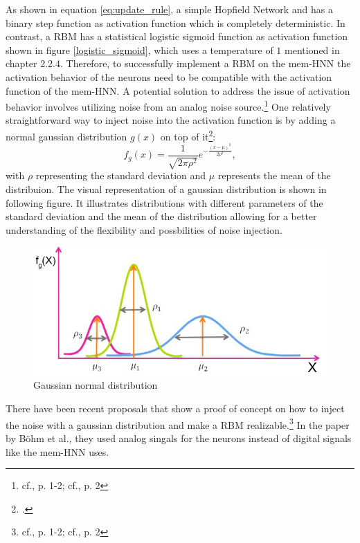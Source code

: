 As shown in equation \ref{eq:update_rule}, a simple Hopfield Network and has a binary step function as activation function which is completely deterministic.
In contrast, a \ac{RBM} has a statistical logistic sigmoid function as activation function shown in figure \ref{logistic_sigmoid}, which uses a temperature of \(1\) mentioned in chapter 2.2.4.
Therefore, to successfully implement a \ac{RBM} on the \ac{mem-HNN} the activation behavior of the neurons need to be compatible with the activation function of the \ac{mem-HNN}.
A potential solution to address the issue of activation behavior involves utilizing noise from an analog noise source.\footnote{cf.\cite{bohmNoiseinjectedAnalogIsing2022}, p. 1-2; cf.\cite{mahmoodiVersatileStochasticDot2019}, p. 2}
One relatively straightforward way to inject noise into the activation function is by adding a normal gaussian distribution \(g(x)\) on top of it\footcite[cf.][3]{bohmNoiseinjectedAnalogIsing2022}:
\begin{equation}
    f_g(x) = \frac{1}{\sqrt{2\pi\rho^2}} e^{-\frac{(x-\mu)^2}{2\rho^2}},
\end{equation}
with \(\rho\) representing the standard deviation and \(\mu\) represents the mean of the distribuion.
The visual representation of a gaussian distribution is shown in following figure. 
It illustrates distributions with different parameters of the standard deviation and the mean of the distribution allowing for a better understanding of the flexibility and possbilities of noise injection. 
\begin{figure}[H]
    \centering
    \includegraphics[width=0.6\linewidth]{graphics/Gaussian_Normal_Distribution_edited.jpg}
    \caption{Gaussian normal distribution\protect\footnotemark}
    \label{normalGaussianDistribution}
\end{figure}
There have been recent proposals that show a proof of concept on how to inject the noise with a gaussian distribution and make a \ac{RBM} realizable.\footnote{cf.\cite{bohmNoiseinjectedAnalogIsing2022}, p. 1-2; cf.\cite{mahmoodiVersatileStochasticDot2019}, p. 2}
In the paper by Böhm et al., they used analog singals for the neurons instead of digital signals like the \ac{mem-HNN} uses. 

